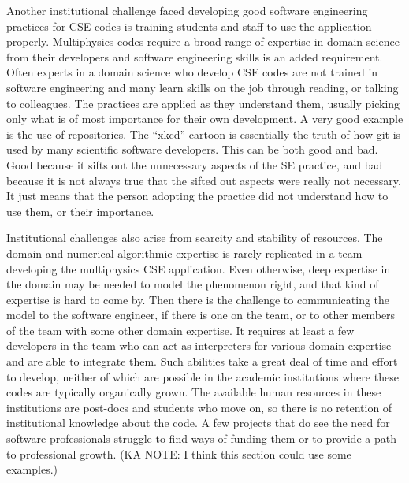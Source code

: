 Another institutional challenge faced developing good software
engineering practices for CSE codes is training students and staff to
use the application properly. Multiphysics codes require a broad range
of expertise in domain science from their developers and software
engineering skills is an added requirement.  Often experts in a domain
science who develop CSE codes are not trained in software engineering
and many learn skills on the job through reading, or talking to
colleagues. The practices are applied as they understand them, usually
picking only what is of most importance for their own development. A
very good example is the use of repositories. The ``xkcd''
 cartoon is
essentially the truth of how git is used by many scientific software
developers. 
This can be both good and bad. Good because it sifts out the unnecessary aspects of the SE
practice, and bad because it is not always true that the sifted out
aspects were really not necessary. It just means that the person
adopting the practice did not understand how to use them, or their
importance. 


Institutional challenges also arise from scarcity and stability of
resources. The domain and numerical algorithmic
expertise is rarely replicated in a team developing the multiphysics
CSE application.  Even otherwise, deep expertise in the domain may be
needed to model the phenomenon right, and that kind of expertise is
hard to come by. Then there is the challenge to communicating the
model to the software engineer, if there is one on the team, or to
other members of the team with some other domain expertise. It requires at least a
few developers in the team who can act as interpreters for various
domain expertise and are able to integrate them. Such abilities take a
great deal of time and effort to develop, neither of which are
possible in the academic institutions where these codes are typically
organically grown. The available human resources in these institutions
are post-docs and students who move on, so there is no retention of
institutional knowledge about the code.  A few projects that do see
the need for software professionals struggle to find ways of funding
them or to provide a path to professional growth. (KA NOTE: I think this section could use some examples.)

